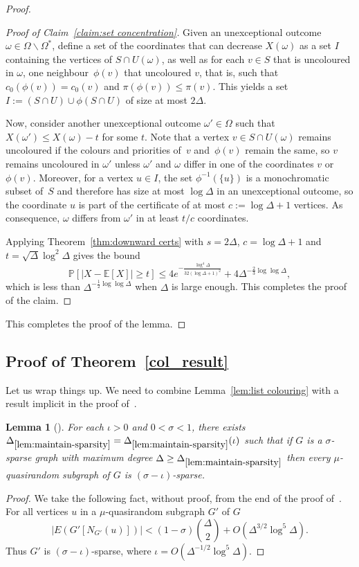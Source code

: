 \documentclass[11pt]{article}
\theoremstyle{plain}
\newtheorem{lemma}[theorem]{Lemma}
\newcommand{\Prob}{\mathbb{P}}
\newcommand{\E}{\mathbb{E}}
\begin{document}
\begin{proof}
\begin{proof}[Proof of Claim~\ref{claim:set concentration}]
  Given an unexceptional outcome $\omega\in \Omega\backslash \Omega^*$,
  define a set of the coordinates that can decrease 
  $X(\omega)$ as a set $I$ containing the vertices of $S\cap U(\omega)$,
  as well as for each $v\in S$ that is uncoloured in $\omega$,
  one neighbour~$\phi(v)$ that uncoloured $v$,
  that is, such that $c_0(\phi(v))=c_0(v)$ and $\pi(\phi(v))\leq\pi(v)$.
  This yields a set $I:=(S\cap U)\cup\phi(S\cap U)$ of size at most $2\Delta$.  

  Now, consider another unexceptional outcome $\omega'\in\Omega$ such that
  $X(\omega')\leq X(\omega)-t$ for some $t$.
  Note that a vertex $v\in S\cap U(\omega)$ remains uncoloured if the colours and
  priorities of~$v$ and~$\phi(v)$ remain the same,
  so $v$ remains uncoloured in $\omega'$
  unless $\omega'$ and $\omega$ differ in one of the coordinates $v$ or $\phi(v)$.
  Moreover, for a vertex $u\in I$, the set $\phi^{-1}(\{u\})$ is a monochromatic subset of~$S$
  and therefore has size at most $\log\Delta$ in an unexceptional outcome,
  so the coordinate $u$ is part of the certificate of at most $c:=\log\Delta+1$ vertices.
  As consequence, $\omega$ differs from $\omega'$ in at least $t/c$ coordinates.
  
  Applying Theorem~\ref{thm:downward certs} with $s=2\Delta$, $c=\log\Delta+1$
  and $t=\sqrt{\Delta}\log^2\Delta$ gives the bound
  \[
  \Prob[\left|X-\E[X]\right|\ge t] \le
  4e^{-\frac{\log^4\Delta}{32(\log\Delta+1)^2}}+4\Delta^{-\frac{2}{3}\log\log\Delta},
  \]
  which is less than $\Delta^{-\frac{1}{2}\log\log\Delta}$
  when $\Delta$ is large enough.
  This completes the proof of the claim.
\end{proof}
This completes the proof of the lemma.
\end{proof}

\subsection{Proof of Theorem~\ref{col_result}}\label{sub:proof}

Let us wrap things up.
We need to combine Lemma~\ref{lem:list colouring} with a result implicit in the proof of~\cite[Lem.~3.20]{BPP18+}. 

\begin{lemma}[\cite{BPP18+}]\label{lem:maintain-sparsity}
  For each $\iota>0$ and $0<\sigma<1$, there exists
  $\Delta_{\ref{lem:maintain-sparsity}}=\Delta_{\ref{lem:maintain-sparsity}}(\iota)$ %
  such that if $G$ is a  $\sigma$-sparse graph with maximum degree $\Delta\ge\Delta_{\ref{lem:maintain-sparsity}}$ then every $\mu$-quasirandom subgraph of $G$ is $(\sigma-\iota)$-sparse.
  \end{lemma}
 \begin{proof}
 We take the following fact, without proof, from the end of the proof of~\cite[Lem.~3.20]{BPP18+}. For all vertices $u$ in a $\mu$-quasirandom subgraph $G'$ of $G$ 
 \[
 |E(G'[N_{G'}(u)])|<(1-\sigma){\Delta\choose 2}+O(\Delta^{3/2}\log^5\Delta).
 \]
 Thus $G'$ is $(\sigma-\iota)$-sparse, where $\iota=O(\Delta^{-1/2}\log^5\Delta)$.  
 \end{proof}
\end{document}
